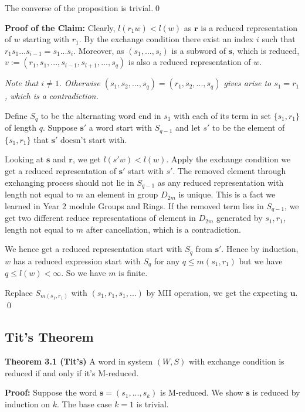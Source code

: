 The converse of the proposition is trivial.\qed

\vspace{\baselineskip}
\noindent \textbf{Proof of the Claim:} Clearly, $l(r_1w) < l(w)$ as $\mathbf{r}$ is a reduced representation of $w$ starting with $r_1$. By the exchange condition there exist an index $i$ such that $r_1s_1...s_{i-1}=s_1...s_i$. Moreover, as $(s_1,...,s_i)$ is a subword of $\mathbf{s}$, which is reduced, $v:=(r_1,s_1,...,s_{i-1},s_{i+1},...,s_q)$ is also a reduced representation of $w$. 

\textit{Note that $i \ne 1$. Otherwise $(s_1,s_2,...,s_q)=(r_1,s_2,...,s_q)$ gives arise to $s_1=r_1$, which is a contradiction. }

Define $S_q$ to be the alternating word end in $s_1$ with each of its term in set $\{s_1,r_1\}$ of length $q$. Suppose $\mathbf{s'}$ a word start with $S_{q-1}$ and let $s'$ to be the element of $\{s_1,r_1\}$ that $\mathbf{s'}$ doesn't start with. 

Looking at $\mathbf{s}$ and $\mathbf{r}$, we get $l(s'w)<l(w)$. Apply the exchange condition we get a reduced representation of $\mathbf{s'}$ start with $s'$. The removed element through exchanging process should not lie in $S_{q-1}$ as any reduced representation with length not equal to $m$ an element in group $D_{2m}$ is unique. This is a fact we learned in Year 2 module Groups and Rings. If the removed term lies in $S_{q-1}$, we get two different reduce representations of element in $D_{2m}$ generated by $s_1,r_1$, length not equal to $m$ after cancellation, which is a contradiction. 

We hence get a reduced representation start with $S_q$ from $\mathbf{s'}$. Hence by induction, $w$ has a reduced expression start with $S_q$ for any $q \le m(s_1,r_1)$ but we have $q \le l(w) < \infty$. So we have $m$ is finite. 

Replace $S_{m(s_1,r_1)}$ with $(s_1,r_1,s_1,...)$ by MII operation, we get the expecting $\mathbf{u}$. \qed 

\subsection{Tit's Theorem}
\noindent \textbf{Theorem 3.1 (Tit's)} A word in system $(W,S)$ with exchange condition is reduced if and only if it's M-reduced. 

\vspace{0.5\baselineskip}
\noindent \textbf{Proof:} Suppose the word $\mathbf{s}=(s_1,...,s_k)$ is M-reduced. We show $\mathbf{s}$ is reduced by induction on $k$. The base case $k=1$ is trivial. 

